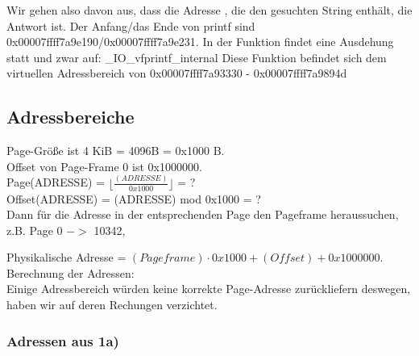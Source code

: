 Wir gehen also davon aus, dass die Adresse , die den gesuchten String enthält, die Antwort ist.
\clearpage
Der Anfang/das Ende von printf sind 0x00007ffff7a9e190/0x00007ffff7a9e231. In der Funktion findet eine Ausdehung statt und zwar auf:
\_IO\_vfprintf\_internal
Diese Funktion befindet sich dem virtuellen Adressbereich von 0x00007ffff7a93330 -   0x00007ffff7a9894d

\subsection{Adressbereiche}
Page-Größe ist 4 KiB = 4096B = 0x1000 B.\\
Offset von Page-Frame 0 ist 0x1000000.\\


Page(ADRESSE) = $\lfloor\frac{(ADRESSE)}{0x1000}\rfloor$ = ?\\\newline
Offset(ADRESSE) = (ADRESSE) mod 0x1000 = ? \\

Dann für die Adresse in der entsprechenden Page den Pageframe heraussuchen, \\ z.B. Page 0 $->$ 10342,  \newline

Physikalische Adresse = $(Pageframe) \cdot 0x1000 + (Offset) + 0x1000000$.
Berechnung der Adressen:\\

Einige Adressbereich würden keine korrekte Page-Adresse zurückliefern deswegen, haben wir auf deren Rechungen verzichtet.
\subsubsection{Adressen aus 1a)}

